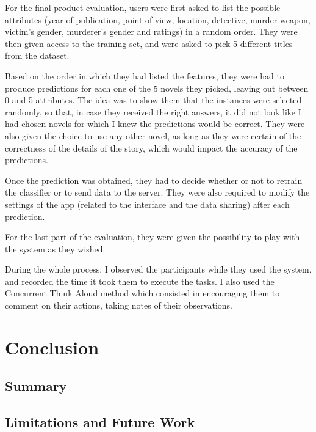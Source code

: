 \documentclass{mproj}
\begin{document}
For the final product evaluation, users were first asked to list the possible attributes (year of publication, point of view, location, detective, murder weapon, victim's gender, murderer's gender and ratings) in a random order. They were then given access to the training set, and were asked to pick 5 different titles from the dataset. \par

Based on the order in which they had listed the features, they were had to produce predictions for each one of the 5 novels they picked, leaving out between 0 and 5 attributes. The idea was to show them that the instances were selected randomly, so that, in case they received the right answers, it did not look like I had chosen novels for which I knew the predictions would be correct. They were also given the choice to use any other novel, as long as they were certain of the correctness of the details of the story, which would impact the accuracy of the predictions. \par 

Once the prediction was obtained, they had to decide whether or not to retrain the classifier or to send data to the server. They were also required to modify the settings of the app (related to the interface and the data sharing) after each prediction. \par

For the last part of the evaluation, they were given the possibility to play with the system as they wished.\par

During the whole process, I observed the participants while they used the system, and recorded the time it took them to execute the tasks. I also used the Concurrent Think Aloud method \cite{usabilitytest} which consisted in encouraging them to comment on their actions, taking notes of their observations.


\chapter{Conclusion}\label{conclusion}

\section{Summary}

\section{Limitations and Future Work}
\end{document}
